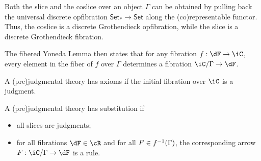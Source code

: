\documentclass{amsart}
\begin{document}
Both the slice and the coslice over an object $\Gamma$ can be obtained by pulling back the universal discrete opfibration $\textsf{Set}_{*} \to \textsf{Set}$ along the (co)representable functor.
Thus, the coslice is a discrete Grothendieck opfibration, while the slice is a discrete Grothendieck fibration.

The fibered Yoneda Lemma then states that for any fibration $f : \dF \to \iC$, every element in the fiber of $f$ over $\Gamma$ determines a fibration $\iC/\Gamma \to \dF$.

\begin{defn}
  A (pre)judgmental theory has axioms if the initial fibration over $\iC$ is a judgment.
\end{defn}

\begin{defn}
  A (pre)judgmental theory has substitution if
  \begin{itemize}
  \item all slices are judgments;
  \item for all fibrations $\dF \in \cR$ and for all $F \in f^{-1}(\Gamma)$, the corresponding arrow $F : \iC/\Gamma \to \dF$ is a rule.
  \end{itemize}
\end{defn}



\end{document}
